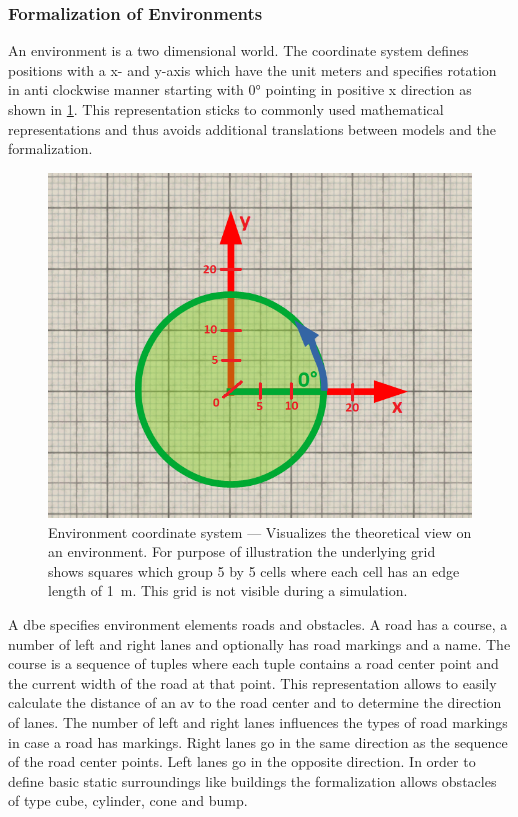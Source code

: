 \subsubsection{Formalization of Environments}
An environment is a two dimensional world.
The coordinate system defines positions with a x- and y-axis which have the unit meters and specifies rotation in anti clockwise manner starting with \ang{0} pointing in positive x direction as shown in \cref{fig:envCooSystem}.
This representation sticks to commonly used mathematical representations and thus avoids additional translations between models and the formalization.
\begin{figure}
    \centering
    \includegraphics[width=.6\linewidth]{pictures/2019-08-12_envCooSystem.png} %
    \medskip
    \caption{%
        Environment coordinate system --- Visualizes the theoretical view on an environment.
        For purpose of illustration the underlying grid shows squares which group 5 by 5 cells where each cell has an edge length of \SI{1}{\metre}.
        This grid is not visible during a simulation.
    }\label{fig:envCooSystem}
\end{figure}
A \gls{dbe} specifies environment elements \ie{} roads and obstacles.
A road has a course, a number of left and right lanes and optionally has road markings and a name.
The course is a sequence of tuples where each tuple contains a road center point and the current width of the road at that point.
This representation allows to easily calculate the distance of an \gls{av} to the road center and to determine the direction of lanes.
The number of left and right lanes influences the types of road markings in case a road has markings.
Right lanes go in the same direction as the sequence of the road center points.
Left lanes go in the opposite direction.
In order to define basic static surroundings like buildings the formalization allows obstacles of type cube, cylinder, cone and bump.
